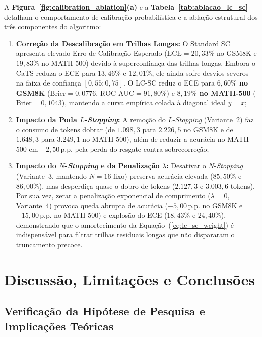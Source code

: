 \documentclass[9pt,conference]{IEEEtran}
\begin{document}
A \textbf{Figura~\ref{fig:calibration_ablation}(a)} e a \textbf{Tabela~\ref{tab:ablacao_lc_sc}} detalham o comportamento de calibra\c{c}\~{a}o probabil\'{i}stica e a abla\c{c}\~{a}o estrutural dos tr\^{e}s componentes do algoritmo:
\begin{enumerate}
    \item \textbf{Corre\c{c}\~{a}o da Descalibra\c{c}\~{a}o em Trilhas Longas:} O Standard SC apresenta elevado Erro de Calibra\c{c}\~{a}o Esperado ($\text{ECE} = 20,33\%$ no GSM8K e $19,83\%$ no MATH-500) devido \`{a} superconfian\c{c}a das trilhas longas. Embora o CaTS reduza o ECE para $13,46\%$ e $12,01\%$, ele ainda sofre desvios severos na faixa de confian\c{c}a $[0,55; 0,75]$. O LC-SC reduz o ECE para \textbf{$6,60\%$ no GSM8K} ($\text{Brier} = 0,0776$, $\text{ROC-AUC} = 91,80\%$) e \textbf{$8,19\%$ no MATH-500} ($\text{Brier} = 0,1043$), mantendo a curva emp\'{i}rica colada \`{a} diagonal ideal $y=x$;
    \item \textbf{Impacto da Poda $L$-\textit{Stopping}:} A remo\c{c}\~{a}o do $L$-\textit{Stopping} (Variante~2) faz o consumo de tokens dobrar (de $1.098,3$ para $2.226,5$ no GSM8K e de $1.648,3$ para $3.249,1$ no MATH-500), al\'{e}m de reduzir a acur\'{a}cia no MATH-500 em $-2,50$\,p.p. pela perda do resgate contra sobrecorre\c{c}\~{a}o;
    \item \textbf{Impacto do $N$-\textit{Stopping} e da Penaliza\c{c}\~{a}o $\lambda$:} Desativar o $N$-\textit{Stopping} (Variante~3, mantendo $N=16$ fixo) preserva acur\'{a}cia elevada ($85,50\%$ e $86,00\%$), mas desperdi\c{c}a quase o dobro de tokens ($2.127,3$ e $3.003,6$ tokens). Por sua vez, zerar a penaliza\c{c}\~{a}o exponencial de comprimento ($\lambda = 0$, Variante~4) provoca queda abrupta de acur\'{a}cia ($-5,00$\,p.p. no GSM8K e $-15,00$\,p.p. no MATH-500) e explos\~{a}o do ECE ($18,43\%$ e $24,40\%$), demonstrando que o amortecimento da Equa\c{c}\~{a}o~(\ref{eq:lc_sc_weight}) \'{e} indispens\'{a}vel para filtrar trilhas residuais longas que n\~{a}o dispararam o truncamento precoce.
\end{enumerate}

\section{Discuss\~{a}o, Limita\c{c}\~{o}es e Conclus\~{o}es}

\subsection{Verifica\c{c}\~{a}o da Hip\'{o}tese de Pesquisa e Implica\c{c}\~{o}es Te\'{o}ricas}
\end{document}
